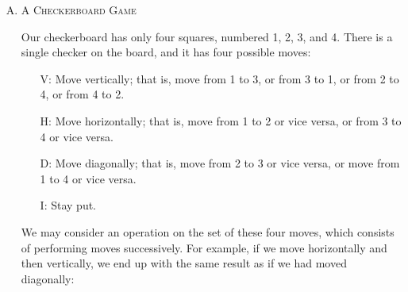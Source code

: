 \documentclass[twoside]{amsart}
\begin{document}
\begin{enumerate}[A.]
\begin{enumerate}[1.]
   \end{enumerate}

   \item \textsc{A Checkerboard Game}
      \begin{figure}[ht]
   \end{figure}

   \noindent Our checkerboard has only four squares, numbered 1, 2, 3, and 4.
   There is a single checker on the board, and it has four possible moves:

   \begin{enumerate}
      \item[V:] Move vertically; that is, move from 1 to 3, or from 3 to 1, or
      from 2 to 4, or from 4 to 2. 
      \item[H:] Move horizontally; that is, move from 1 to 2 or vice versa,
      or from 3 to 4 or vice versa.
      \item[D:] Move diagonally; that is, move from 2 to 3 or vice versa, or
      move from 1 to 4 or vice versa.
      \item[I:] Stay put.
   \end{enumerate}

   \noindent We may consider an operation on the set of these four moves, which
   consists of performing moves successively. For example, if we move
   horizontally and then vertically, we end up with the same result as if we
   had moved diagonally:


\end{enumerate}
\end{document}
